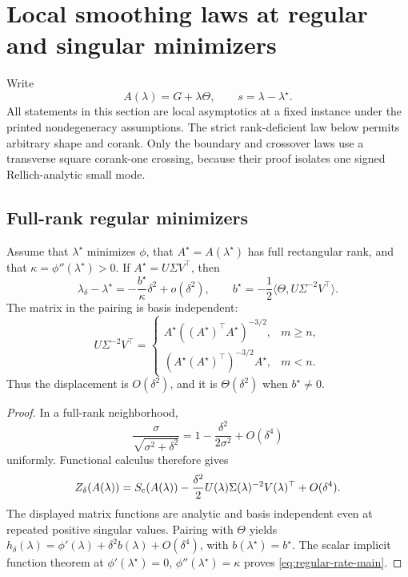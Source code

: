 \section{Local smoothing laws at regular and singular minimizers}
\label{sec:rates}

Write
\[
 A(\lambda)=G+\lambda\Theta,
 \qquad s=\lambda-\lambda^\star.
\]
All statements in this section are local asymptotics at a fixed instance
under the printed nondegeneracy assumptions.  The strict rank-deficient law
below permits arbitrary shape and corank.  Only the boundary and crossover
laws use a transverse square corank-one crossing, because their proof isolates
one signed Rellich-analytic small mode.

\subsection{Full-rank regular minimizers}

\begin{theorem}
\label{thm:rate-regular}
Assume that \(\lambda^\star\) minimizes \(\phi\), that
\(A^\star=A(\lambda^\star)\) has full rectangular rank, and that
\(\kappa=\phi''(\lambda^\star)>0\).  If
\(A^\star=U\Sigma V^\top\), then
\begin{equation}
 \lambda_\delta-\lambda^\star
 =-\frac{b^\star}{\kappa}\delta^2+o(\delta^2),
 \qquad
 b^\star=-\frac12
 \langle\Theta,U\Sigma^{-2}V^\top\rangle.
 \label{eq:regular-rate-main}
\end{equation}
The matrix in the pairing is basis independent:
\begin{equation}
 U\Sigma^{-2}V^\top=
 \begin{cases}
 A^\star((A^\star)^\top A^\star)^{-3/2},&m\ge n,\\
 (A^\star(A^\star)^\top)^{-3/2}A^\star,&m<n.
 \end{cases}
 \label{eq:regular-intrinsic-main}
\end{equation}
Thus the displacement is \(O(\delta^2)\), and it is
\(\Theta(\delta^2)\) when \(b^\star\ne0\).
\end{theorem}

\begin{proof}
In a full-rank neighborhood,
\[
 \frac{\sigma}{\sqrt{\sigma^2+\delta^2}}
 =1-\frac{\delta^2}{2\sigma^2}+O(\delta^4)
\]
uniformly.  Functional calculus therefore gives
\[
 Z_\delta(A(\lambda))
 =S_{\mathrm c}(A(\lambda))
 -\frac{\delta^2}{2}
 U(\lambda)\Sigma(\lambda)^{-2}V(\lambda)^\top
 +O(\delta^4).
\]
The displayed matrix functions are analytic and basis independent even at
repeated positive singular values.  Pairing with \(\Theta\) yields
\(h_\delta(\lambda)=\phi'(\lambda)+\delta^2b(\lambda)+O(\delta^4)\), with
\(b(\lambda^\star)=b^\star\).  The scalar implicit function theorem at
\(\phi'(\lambda^\star)=0\), \(\phi''(\lambda^\star)=\kappa\) proves
\eqref{eq:regular-rate-main}.
\end{proof}

